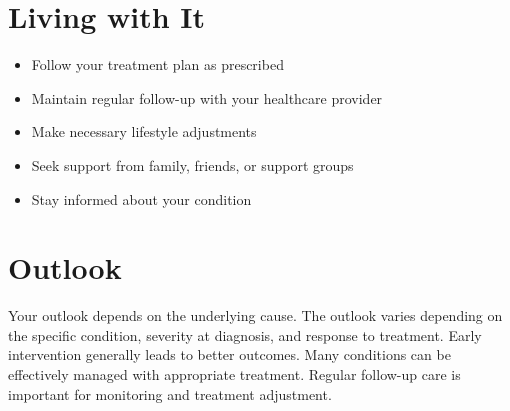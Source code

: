 \section{Living with It}
\begin{itemize}[noitemsep]
  \item Follow your treatment plan as prescribed
  \item Maintain regular follow-up with your healthcare provider
  \item Make necessary lifestyle adjustments
  \item Seek support from family, friends, or support groups
  \item Stay informed about your condition
\end{itemize}
\section{Outlook}
Your outlook depends on the underlying cause. The outlook varies depending on the specific condition, severity at diagnosis, and response to treatment. Early intervention generally leads to better outcomes. Many conditions can be effectively managed with appropriate treatment. Regular follow-up care is important for monitoring and treatment adjustment.

